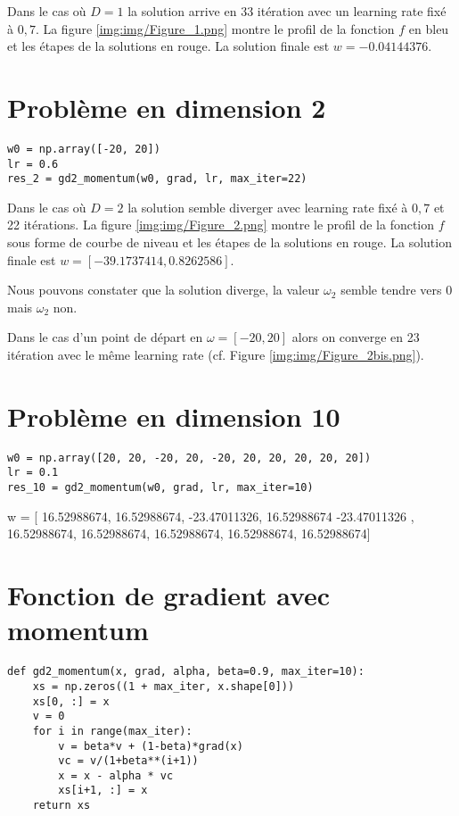 \documentclass[12pt]{article}
\begin{document}

Dans le cas où $D=1$ la solution arrive en 33 itération avec un learning rate fixé à $0,7$. La figure \ref{img:img/Figure_1.png} montre le profil de la fonction $f$ en bleu et les étapes de la solutions en rouge. La solution finale est $w = -0.04144376$.

\newpage
\section*{Problème en dimension 2}

\begin{lstlisting}
w0 = np.array([-20, 20])
lr = 0.6
res_2 = gd2_momentum(w0, grad, lr, max_iter=22)
\end{lstlisting}


Dans le cas où $D=2$ la solution semble diverger avec learning rate fixé à $0,7$ et 22 itérations. La figure \ref{img:img/Figure_2.png} montre le profil de la fonction $f$ sous forme de courbe de niveau et les étapes de la solutions en rouge. La solution finale est $w = [-39.1737414, 0.8262586]$.

Nous pouvons constater que la solution diverge, la valeur $\omega_2$ semble tendre vers 0 mais $\omega_2$ non.

Dans le cas d'un point de départ en $\omega = [-20, 20]$ alors on converge en 23 itération avec le même learning rate (cf. Figure \ref{img:img/Figure_2bis.png}).


\newpage
\section*{Problème en dimension 10}
\begin{lstlisting}
w0 = np.array([20, 20, -20, 20, -20, 20, 20, 20, 20, 20])
lr = 0.1
res_10 = gd2_momentum(w0, grad, lr, max_iter=10)
\end{lstlisting}

w = [ 16.52988674, 16.52988674, -23.47011326, 16.52988674 -23.47011326
, 16.52988674, 16.52988674, 16.52988674, 16.52988674, 16.52988674]


\newpage
\section*{Fonction de gradient avec momentum}

\begin{lstlisting}
def gd2_momentum(x, grad, alpha, beta=0.9, max_iter=10):
    xs = np.zeros((1 + max_iter, x.shape[0]))
    xs[0, :] = x
    v = 0
    for i in range(max_iter):
        v = beta*v + (1-beta)*grad(x)
        vc = v/(1+beta**(i+1))
        x = x - alpha * vc
        xs[i+1, :] = x
    return xs
\end{lstlisting}
\end{document}
